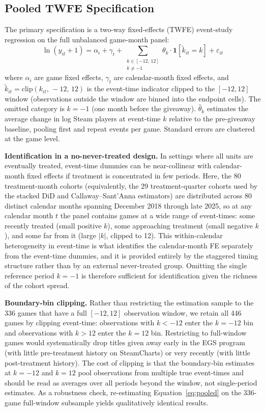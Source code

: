 \documentclass[11pt]{article}
\begin{document}
\subsection{Pooled TWFE Specification}

The primary specification is a two-way fixed-effects (TWFE) event-study regression on
the full unbalanced game-month panel:
\begin{equation}
\label{eq:pooled}
\ln(y_{it} + 1) = \alpha_i + \gamma_t +
  \sum_{\substack{k \in [-12,\,12] \\ k \neq -1}}
  \theta_k \cdot \mathbf{1}[\tilde{k}_{it} = k]
  + \varepsilon_{it}
\end{equation}
where $\alpha_i$ are game fixed effects, $\gamma_t$ are calendar-month fixed effects,
and $\tilde{k}_{it} = \text{clip}(k_{it},\,-12,\,12)$ is the event-time indicator
clipped to the $[-12, 12]$ window (observations outside the window are binned into the
endpoint cells). The omitted category is $k = -1$ (one month before the giveaway).
$\hat{\theta}_k$ estimates the average change in log Steam players at event-time $k$
relative to the pre-giveaway baseline, pooling first and repeat events per game.
Standard errors are clustered at the game level.

\textbf{Identification in a no-never-treated design.}
In settings where all units are eventually treated, event-time dummies can 
be near-collinear with calendar-month fixed effects if treatment is
concentrated in few periods. Here, the 80 treatment-month cohorts (equivalently,
the 29 treatment-quarter cohorts used by the stacked DiD and Callaway--Sant'Anna
estimators) are distributed across 80 distinct calendar months spanning December
2018 through late 2025, so at any calendar month $t$ the panel contains games at
a wide range
of event-times: some recently treated (small positive $k$), some approaching
treatment (small negative $k$), and some far from it (large $|k|$, clipped to
12). This within-calendar heterogeneity in event-time is what identifies the
calendar-month FE separately from the event-time dummies, and it is provided
entirely by the staggered timing structure rather than by an external never-treated
group. Omitting the single reference period $k = -1$ is therefore sufficient for
identification given the richness of the cohort spread.

\textbf{Boundary-bin clipping.}
Rather than restricting the estimation sample to the 336 games that have a full
$[-12, 12]$ observation window, we retain all 446 games by clipping event-time:
observations with $k < -12$ enter the $k = -12$ bin and observations with $k > 12$
enter the $k = 12$ bin. Restricting to full-window games would systematically
drop titles given away early in the EGS program (with little pre-treatment
history on SteamCharts) or very recently (with little post-treatment history). 
The cost of clipping is that the boundary-bin estimates at $k = -12$ and $k = 12$ pool observations
from multiple true event-times and should be read as averages over all periods
beyond the window, not single-period estimates.
As a robustness check, re-estimating Equation~\eqref{eq:pooled} on the 336-game
full-window subsample yields qualitatively identical results.
\end{document}
